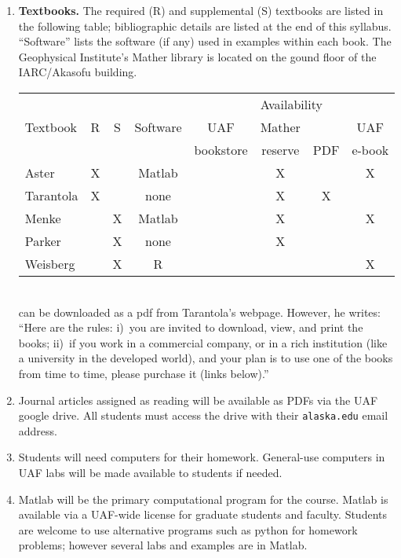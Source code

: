 \documentclass[10pt,titlepage,fleqn]{article}
\begin{document}
\begin{enumerate}
\begin{enumerate}
\item {\bf Textbooks.} The required (R) and supplemental (S) textbooks are listed in the following table; bibliographic details are listed at the end of this syllabus. ``Software'' lists the software (if any) used in examples within each book. The Geophysical Institute's Mather library is located on the gound floor of the IARC/Akasofu building.

\begin{tabular}{l|c|c|c|c|c|c|c}
\hline
     &          & &      & \multicolumn{4}{c}{Availability}    \\ \cline{5-8}
Textbook & R & S & Software & UAF       & Mather  &     & UAF     \\
     &          & &          & bookstore & reserve & PDF & e-book  \\ \hline
\cite{AsterE2} Aster           & X & & Matlab & & X & & X \\ \hline
\cite{Tarantola2005} Tarantola & X & & none   & & X & X & \\ \hline
\cite{MenkeE3} Menke           & & X & Matlab & & X & & X \\ \hline
\cite{Parker} Parker           & & X & none   & & X & & \\ \hline
\cite{WeisbergE4} Weisberg     & & X & R      & &   & & X \\ \hline
\end{tabular} \\

\cite{Tarantola2005} can be downloaded as a pdf from Tarantola's webpage. However, he writes: ``Here are the rules: i)~you are invited to download, view, and print the books; ii)~if you work in a commercial company, or in a rich institution (like a university in the developed world), and your plan is to use one of the books from time to time, please purchase it (links below).''

\item Journal articles assigned as reading will be available as PDFs via the UAF google drive. All students must access the drive with their \verb+alaska.edu+ email address.

\item Students will need computers for their homework. General-use computers in UAF labs will be made available to students if needed.

\item Matlab will be the primary computational program for the course.
Matlab is available via a UAF-wide license for graduate students and faculty.
Students are welcome to use alternative programs such as python for homework problems; however several labs and examples are in Matlab.


\end{enumerate}
\end{enumerate}
\end{document}
